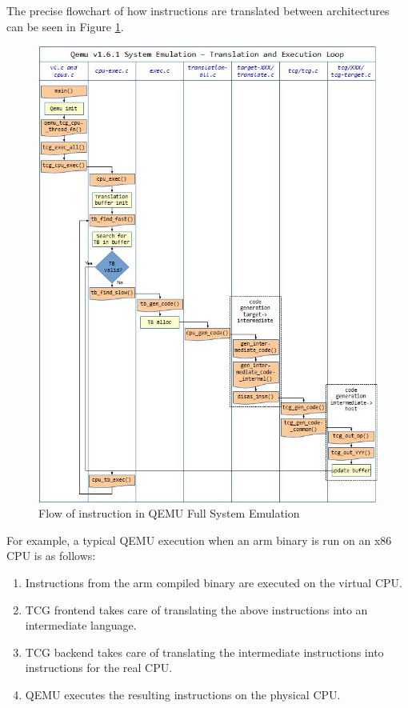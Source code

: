The precise flowchart of how instructions are translated between architectures can be seen in Figure \ref{fig:qemuflow}.

\begin{figure}[htp]
\centering
\includegraphics[width=\linewidth]{images/qemutcg.jpg}
\caption{Flow of instruction in QEMU Full System Emulation}
\label{fig:qemuflow}
\end{figure}

For example, a typical QEMU execution when an arm binary is run on an x86 CPU is as follows: 
\begin{enumerate}
    \item Instructions from the arm compiled binary are executed on the virtual CPU.
    \item TCG frontend takes care of translating the above instructions into an intermediate language. 
    \item TCG backend takes care of translating the intermediate instructions into instructions for the real CPU. 
    \item QEMU executes the resulting instructions on the physical CPU. 
\end{enumerate}
